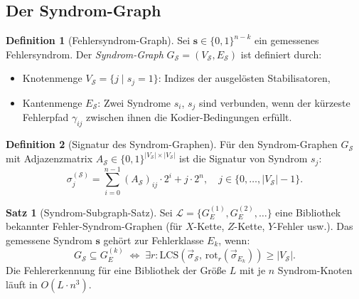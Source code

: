 ﻿\documentclass[a4paper,12pt]{article}
\theoremstyle{definition}
\newtheorem{definition}{Definition}
\newtheorem{satz}{Satz}
\begin{document}
\subsection{Der Syndrom-Graph}

\begin{definition}[Fehlersyndrom-Graph]
\label{def:syndrom_graph}
Sei $\mathbf{s} \in \{0,1\}^{n-k}$ ein gemessenes Fehlersyndrom.
Der \emph{Syndrom-Graph} $G_{\mathcal{S}} = (V_{\mathcal{S}}, E_{\mathcal{S}})$
ist definiert durch:
\begin{itemize}
    \item Knotenmenge $V_{\mathcal{S}} = \{j \mid s_j = 1\}$: Indizes der
          ausge\-l\"osten Stabilisatoren,
    \item Kantenmenge $E_{\mathcal{S}}$: Zwei Syndrome $s_i$, $s_j$ sind
          verbunden, wenn der k\"urzeste Fehlerpfad $\gamma_{ij}$ zwischen
          ihnen die Kodier-Bedingungen erf\"ullt.
\end{itemize}
\end{definition}

\begin{definition}[Signatur des Syndrom-Graphen]
\label{def:syndrom_sig}
F\"ur den Syndrom-Graphen $G_{\mathcal{S}}$ mit Adjazenzmatrix
$A_{\mathcal{S}} \in \{0,1\}^{|V_{\mathcal{S}}| \times |V_{\mathcal{S}}|}$
ist die Signatur von Syndrom $s_j$:
\[
\sigma_j^{(\mathcal{S})} = \sum_{i=0}^{n-1}
(A_{\mathcal{S}})_{ij} \cdot 2^i + j \cdot 2^n,
\quad j \in \{0, \ldots, |V_{\mathcal{S}}|-1\}.
\]
\end{definition}

\begin{satz}[Syndrom-Subgraph-Satz]
\label{satz:syndrom_subgraph}
Sei $\mathcal{L} = \{G_E^{(1)}, G_E^{(2)}, \ldots\}$ eine Bibliothek
bekannter Fehler-Syndrom-Graphen (f\"ur $X$-Kette, $Z$-Kette, $Y$-Fehler usw.).
Das gemessene Syndrom $\mathbf{s}$ geh\"ort zur Fehlerklasse $E_k$, wenn:
\[
G_{\mathcal{S}} \subseteq G_E^{(k)} \;\Longleftrightarrow\;
\exists r: \mathrm{LCS}\!\left(\vec{\sigma}_{\mathcal{S}},\,
\mathrm{rot}_r(\vec{\sigma}_{E_k})\right) \geq |V_{\mathcal{S}}|.
\]
Die Fehlererkennung f\"ur eine Bibliothek der Gr\"o{\ss}e $L$ mit je $n$
Syndrom-Knoten l\"auft in $O(L \cdot n^3)$.
\end{satz}
\end{document}
